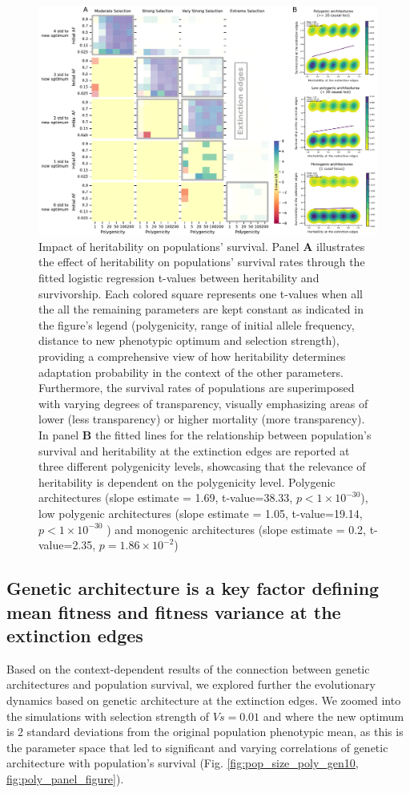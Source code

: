 \documentclass{article}
\begin{document}
\begin{figure}[h]
    \centering
    \includegraphics[width=1\textwidth]{figures/heristabilityvs_survivo_edges.pdf}
    \caption{Impact of heritability on populations' survival. Panel \textbf{A} illustrates the effect of heritability on populations' survival rates through the fitted logistic regression t-values between heritability and survivorship. Each colored square represents one t-values when all the  all the remaining parameters are kept constant as indicated in the figure's legend (polygenicity, range of initial allele frequency, distance to new phenotypic optimum and selection strength), providing a comprehensive view of how heritability determines adaptation probability in the context of the other parameters. Furthermore,  the survival rates of populations are superimposed with varying degrees of transparency, visually emphasizing areas of lower (less transparency) or higher mortality (more transparency). In panel \textbf{B} the fitted lines for the relationship between population's survival and heritability at the extinction edges are reported at three different polygenicity levels, showcasing that the relevance of heritability is dependent on the polygenicity level. Polygenic architectures (slope estimate = 1.69, t-value=38.33,  $p<1 \times 10^{-30}$), low polygenic architectures (slope estimate = 1.05, t-value=19.14,  $p<1 \times 10^{-30}$ ) and monogenic architectures (slope estimate = 0.2, t-value=2.35,  $p=1.86 \times 10^{-2}$)}
    \label{fig:h2_panel_figure}
\end{figure}

\subsection{Genetic architecture is a key factor defining mean fitness and fitness variance at the extinction edges}
Based on the context-dependent results of the connection between genetic architectures and population survival, we explored further the evolutionary dynamics based on genetic architecture at the extinction edges. We zoomed into the simulations with selection strength of $Vs=0.01$  and where the new optimum is 2 standard deviations from the original population phenotypic mean, as this is the parameter space that led to significant and varying correlations of genetic architecture with population's survival (Fig. \ref{fig:pop_size_poly_gen10, fig:poly_panel_figure}). 
\end{document}
